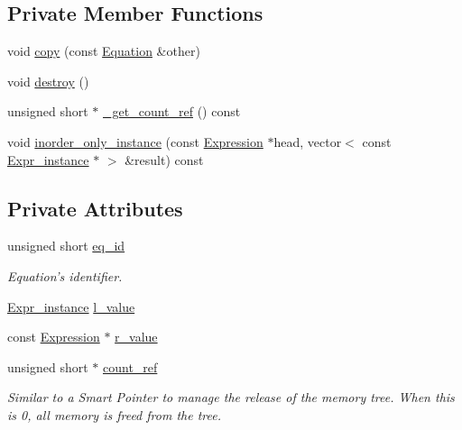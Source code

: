 \subsection*{Private Member Functions}
\begin{DoxyCompactItemize}
\item 
void \hyperlink{classgenevalmag_1_1Equation_a25cb4f7a1a49ac1d1408fc54e1d1378e}{copy} (const \hyperlink{classgenevalmag_1_1Equation}{Equation} \&other)
\item 
void \hyperlink{classgenevalmag_1_1Equation_a3314fa8459cfd0f0316daa6d38a895ee}{destroy} ()
\item 
unsigned short $\ast$ \hyperlink{classgenevalmag_1_1Equation_ab900ac60c5c2b4427970f7d68361db20}{\_\-get\_\-count\_\-ref} () const 
\item 
void \hyperlink{classgenevalmag_1_1Equation_a34b874554d9ed47d37473ae4dab5d16e}{inorder\_\-only\_\-instance} (const \hyperlink{classgenevalmag_1_1Expression}{Expression} $\ast$head, vector$<$ const \hyperlink{classgenevalmag_1_1Expr__instance}{Expr\_\-instance} $\ast$ $>$ \&result) const 
\end{DoxyCompactItemize}
\subsection*{Private Attributes}
\begin{DoxyCompactItemize}
\item 
unsigned short \hyperlink{classgenevalmag_1_1Equation_abcf149aeb80efa3ccb5c41886570e215}{eq\_\-id}
\begin{DoxyCompactList}\small\item\em Equation's identifier. \item\end{DoxyCompactList}\item 
\hyperlink{classgenevalmag_1_1Expr__instance}{Expr\_\-instance} \hyperlink{classgenevalmag_1_1Equation_af6dfdfddb6eff2b61a359ff5d58c5144}{l\_\-value}
\item 
const \hyperlink{classgenevalmag_1_1Expression}{Expression} $\ast$ \hyperlink{classgenevalmag_1_1Equation_abdc49df03becf19ea7f5aa1b89b749c0}{r\_\-value}
\item 
unsigned short $\ast$ \hyperlink{classgenevalmag_1_1Equation_a96ea50e0ed15373e6246fd00d8c79ac4}{count\_\-ref}
\begin{DoxyCompactList}\small\item\em Similar to a Smart Pointer to manage the release of the memory tree. When this is 0, all memory is freed from the tree. \item\end{DoxyCompactList}\end{DoxyCompactItemize}


